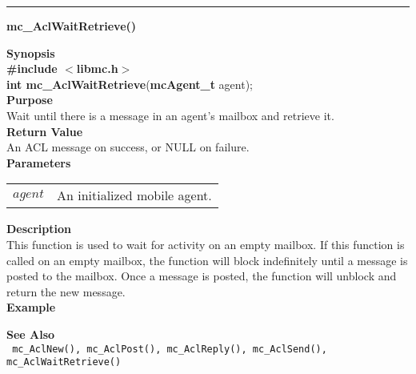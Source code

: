 \noindent
\vspace{5pt}
\rule{6.5in}{0.015in}
\noindent
{}
{\LARGE \bf mc\_AclWaitRetrieve()}\\
\label{api:mc_AclWaitRetrieve()}

\noindent
{\bf Synopsis}\\
{\bf \#include $<$libmc.h$>$}\\
{\bf int mc\_AclWaitRetrieve}({\bf mcAgent\_t} agent);\\

\noindent
{\bf Purpose}\\
Wait until there is a message in an agent's mailbox and retrieve it.\\

\noindent
{\bf Return Value}\\
An ACL message on success, or NULL on failure.\\

\noindent
{\bf Parameters}
\vspace{-0.1in}
\begin{description}
\item
\begin{tabular}{p{10 mm}p{145 mm}} 
$agent$ & An initialized mobile agent.
\end{tabular}
\end{description}

\noindent
{\bf Description}\\
This function is used to wait for activity on an empty mailbox. If this
function is called on an empty mailbox, the function will block indefinitely
until a message is posted to the mailbox. Once a message is posted, the
function will unblock and return the new message. \\

\noindent
{\bf Example}\\
\noindent
{\footnotesize }

\noindent
{\bf See Also}\\
\texttt{
  mc\_AclNew(), mc\_AclPost(), mc\_AclReply(), mc\_AclSend(), 
    \linebreak mc\_AclWaitRetrieve()
}

